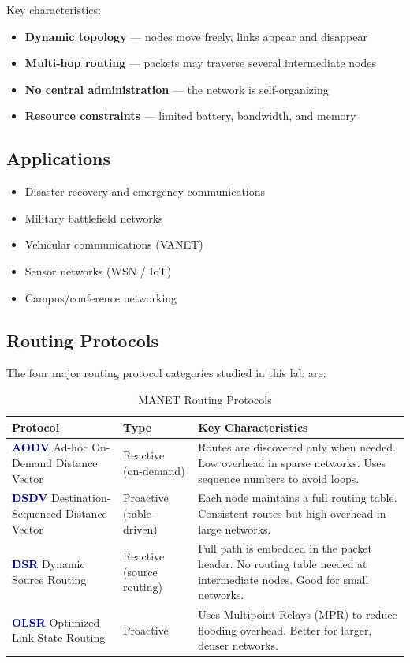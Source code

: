 \documentclass[12pt,a4paper]{article}
\newcommand{\protocol}[1]{\textbf{\textcolor{darkblue}{#1}}}
\begin{document}
Key characteristics:
\begin{itemize}[leftmargin=1.5em]
  \item \textbf{Dynamic topology} — nodes move freely, links appear and disappear
  \item \textbf{Multi-hop routing} — packets may traverse several intermediate nodes
  \item \textbf{No central administration} — the network is self-organizing
  \item \textbf{Resource constraints} — limited battery, bandwidth, and memory
\end{itemize}

\subsection{Applications}

\begin{itemize}[leftmargin=1.5em]
  \item Disaster recovery and emergency communications
  \item Military battlefield networks
  \item Vehicular communications (VANET)
  \item Sensor networks (WSN / IoT)
  \item Campus/conference networking
\end{itemize}

\subsection{Routing Protocols}

The four major routing protocol categories studied in this lab are:

\begin{table}[H]
\centering
\caption{MANET Routing Protocols}
\begin{tabularx}{\textwidth}{lXX}
\toprule
\textbf{Protocol} & \textbf{Type} & \textbf{Key Characteristics} \\
\midrule
\protocol{AODV} \newline Ad-hoc On-Demand Distance Vector &
  Reactive (on-demand) &
  Routes are discovered only when needed. Low overhead in sparse networks. Uses sequence numbers to avoid loops. \\
\midrule
\protocol{DSDV} \newline Destination-Sequenced Distance Vector &
  Proactive (table-driven) &
  Each node maintains a full routing table. Consistent routes but high overhead in large networks. \\
\midrule
\protocol{DSR} \newline Dynamic Source Routing &
  Reactive (source routing) &
  Full path is embedded in the packet header. No routing table needed at intermediate nodes. Good for small networks. \\
\midrule
\protocol{OLSR} \newline Optimized Link State Routing &
  Proactive &
  Uses Multipoint Relays (MPR) to reduce flooding overhead. Better for larger, denser networks. \\
\bottomrule
\end{tabularx}
\end{table}
\end{document}
